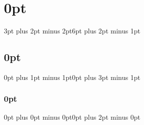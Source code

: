 \titlespacing\section{0pt}{3pt plus 2pt minus 2pt}{6pt plus 2pt minus 1pt}
\titlespacing\subsection{0pt}{0pt plus 1pt minus 1pt}{0pt plus 3pt minus 1pt}
\titlespacing\subsubsection{0pt}{0pt plus 0pt minus 0pt}{0pt plus 2pt minus 0pt}

\usetikzlibrary{shadows}





